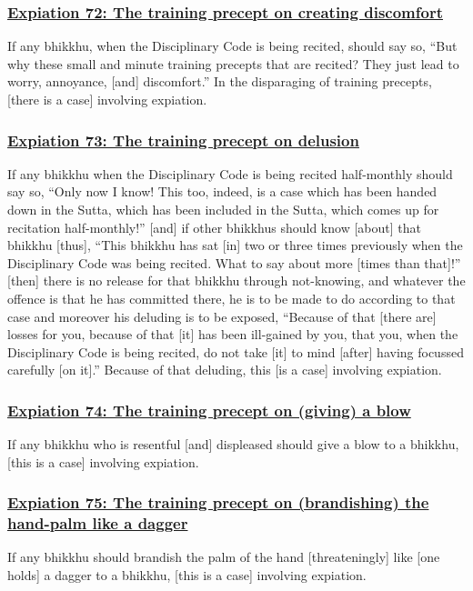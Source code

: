 \subsubsection*{\hyperref[pac72]{Expiation 72: The training precept on creating discomfort}}
\label{exp72}
If any bhikkhu, when the Disciplinary Code is being recited, should say so, ``But why these small and minute training precepts that are recited? They just lead to worry, annoyance, [and] discomfort.'' In the disparaging of training precepts, [there is a case] involving expiation.

\subsubsection*{\hyperref[pac73]{Expiation 73: The training precept on delusion}}
\label{exp73}
If any bhikkhu when the Disciplinary Code is being recited half-monthly should say so, ``Only now I know! This too, indeed, is a case which has been handed down in the Sutta, which has been included in the Sutta, which comes up for recitation half-monthly!'' [and] if other bhikkhus should know [about] that bhikkhu [thus], ``This bhikkhu has sat [in] two or three times previously when the Disciplinary Code was being recited. What to say about more [times than that]!'' [then] there is no release for that bhikkhu through not-knowing, and whatever the offence is that he has committed there, he is to be made to do according to that case and moreover his deluding is to be exposed, ``Because of that [there are] losses for you, because of that [it] has been ill-gained by you, that you, when the Disciplinary Code is being recited, do not take [it] to mind [after] having focussed carefully [on it].'' Because of that deluding, this [is a case] involving expiation.

\subsubsection*{\hyperref[pac74]{Expiation 74: The training precept on (giving) a blow}}
\label{exp74}
If any bhikkhu who is resentful [and] displeased should give a blow to a bhikkhu, [this is a case] involving expiation.

\subsubsection*{\hyperref[pac75]{Expiation 75: The training precept on (brandishing) the hand-palm like a dagger}}
\label{exp75}
If any bhikkhu should brandish the palm of the hand [threateningly] like [one holds] a dagger to a bhikkhu, [this is a case] involving expiation.

